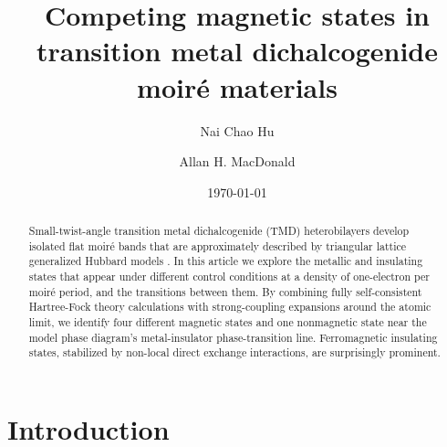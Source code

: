 \documentclass[%
 reprint,
 superscriptaddress,
 amsmath,amssymb,
 aps,
 prx,
 floatfix,
]{revtex4-2}
\newcommand{\<}{\langle}
\renewcommand{\>}{\rangle}
\renewcommand{\(}{\left(}
\renewcommand{\)}{\right)}
\renewcommand{\[}{\left[}
\renewcommand{\]}{\right]}
\begin{document}

\title{Competing magnetic states in transition metal dichalcogenide moir\'e materials}%

\author{Nai Chao Hu}

\author{Allan H. MacDonald}


\date{\today}%

\begin{abstract}
Small-twist-angle transition metal dichalcogenide (TMD) heterobilayers develop 
isolated flat moiré bands that are approximately described by triangular lattice generalized 
Hubbard models \cite{fengchengHubbard}.  
In this article we explore the metallic and insulating states 
that appear under different control conditions
at a density of one-electron per moir\'e period, and the transitions between them.
By combining fully self-consistent Hartree-Fock theory 
calculations with strong-coupling expansions around
the atomic limit, we identify four different magnetic states and one nonmagnetic state
near the model phase diagram's metal-insulator phase-transition line.  
Ferromagnetic insulating states, stabilized by non-local direct exchange interactions,
are surprisingly prominent.
\end{abstract}

\maketitle


\section{\label{sec:intro}Introduction}
\end{document}
